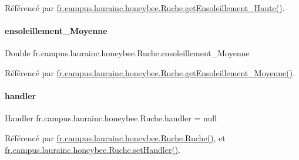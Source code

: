 Référencé par \hyperlink{classfr_1_1campus_1_1laurainc_1_1honeybee_1_1_ruche_a0b0953f30bc0fff703abff84d55c696b}{fr.\+campus.\+laurainc.\+honeybee.\+Ruche.\+get\+Ensoleillement\+\_\+\+Haute()}.

\mbox{\label{classfr_1_1campus_1_1laurainc_1_1honeybee_1_1_ruche_af3da6a0f98d377ec6633f40a8c0e5c99}} 
\paragraph{\texorpdfstring{ensoleillement\+\_\+\+Moyenne}{ensoleillement\_Moyenne}}
{\footnotesize\ttfamily Double fr.\+campus.\+laurainc.\+honeybee.\+Ruche.\+ensoleillement\+\_\+\+Moyenne\hspace{0.3cm}{\ttfamily [private]}}



Référencé par \hyperlink{classfr_1_1campus_1_1laurainc_1_1honeybee_1_1_ruche_ab516b3c8cee816884e2f23c863078837}{fr.\+campus.\+laurainc.\+honeybee.\+Ruche.\+get\+Ensoleillement\+\_\+\+Moyenne()}.

\mbox{\label{classfr_1_1campus_1_1laurainc_1_1honeybee_1_1_ruche_a9689ca454694434549e5fffca876ffae}} 
\paragraph{\texorpdfstring{handler}{handler}}
{\footnotesize\ttfamily Handler fr.\+campus.\+laurainc.\+honeybee.\+Ruche.\+handler = null\hspace{0.3cm}{\ttfamily [private]}}



Référencé par \hyperlink{classfr_1_1campus_1_1laurainc_1_1honeybee_1_1_ruche_abb08f6c820fe60fd569bfabc8207ee94}{fr.\+campus.\+laurainc.\+honeybee.\+Ruche.\+Ruche()}, et \hyperlink{classfr_1_1campus_1_1laurainc_1_1honeybee_1_1_ruche_acac6e35c9bc030a5cf608b245703d32e}{fr.\+campus.\+laurainc.\+honeybee.\+Ruche.\+set\+Handler()}.

